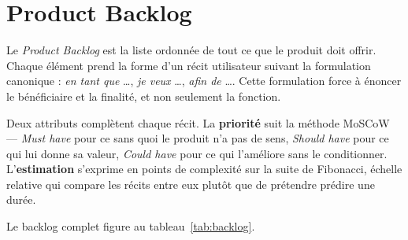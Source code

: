 \section{Product Backlog}

Le \emph{Product Backlog} est la liste ordonnée de tout ce que le produit doit offrir.
Chaque élément prend la forme d'un récit utilisateur suivant la formulation
canonique : \emph{en tant que} \dots, \emph{je veux} \dots, \emph{afin de} \dots. Cette
formulation force à énoncer le bénéficiaire et la finalité, et non seulement la
fonction.

Deux attributs complètent chaque récit. La \textbf{priorité} suit la méthode MoSCoW —
\emph{Must have} pour ce sans quoi le produit n'a pas de sens, \emph{Should have} pour
ce qui lui donne sa valeur, \emph{Could have} pour ce qui l'améliore sans le
conditionner. L'\textbf{estimation} s'exprime en points de complexité sur la suite de
Fibonacci, échelle relative qui compare les récits entre eux plutôt que de prétendre
prédire une durée.

Le backlog complet figure au tableau~\ref{tab:backlog}.

\newcommand{\epictitre}[1]{%
  \midrule
  \multicolumn{5}{@{}l}{\cellcolor{hypnolight}\textbf{#1}}\\
  \midrule}

